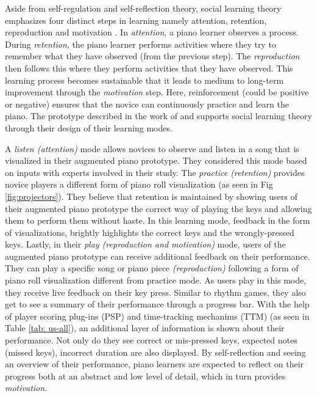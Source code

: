 \documentclass[sigchi, review]{acmart}
\begin{document}
Aside from self-regulation and self-reflection theory, social learning theory emphasizes four distinct steps in learning namely attention, retention, reproduction and motivation \cite{bandura1977social}. In \textit{attention}, a piano learner observes a process. During \textit{retention}, the piano learner performs activities where they try to remember what they have observed (from the previous step). The \textit{reproduction} then follows this where they perform activities that they have observed. This learning process becomes sustainable that it leads to medium to long-term improvement through the \textit{motivation} step. Here, reinforcement (could be positive or negative) ensures that the novice can continuously practice and learn the piano. The prototype described in the work of \citet{weing2013piano} and \citet{rogers2014piano} supports social learning theory through their design of their learning modes. 

A \textit{listen (attention)} mode allows novices to observe and listen in a song that is visualized in their augmented piano prototype. They considered this mode based on inputs with experts involved in their study. The \textit{practice (retention)} provides novice players a different form of piano roll visualization (as seen in Fig \ref{fig:projectors}). They believe that retention is maintained by showing users of their augmented piano prototype the correct way of playing the keys and allowing them to perform them without haste. In this learning mode, feedback in the form of visualizations, brightly highlights the correct keys and the wrongly-pressed keys. Lastly, in their \textit{play (reproduction and motivation)} mode, users of the augmented piano prototype can receive additional feedback on their performance. They can play a specific song or piano piece \textit{(reproduction)} following a form of piano roll visualization different from practice mode. As users play in this mode, they receive live feedback on their key press. Similar to rhythm games, they also get to see a summary of their performance through a progress bar. With the help of player scoring plug-ins (PSP) and time-tracking mechanims (TTM) (as seen in Table \ref{tab: us-all}), an additional layer of information is shown about their performance. Not only do they see correct or mis-pressed keys, expected notes (missed keys), incorrect duration are also displayed. By self-reflection and seeing an overview of their performance, piano learners are expected to reflect on their progress both at an abstract and low level of detail, which in turn provides \textit{motivation}.
\end{document}
